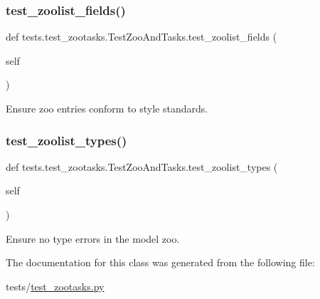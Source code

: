 \subsubsection{\texorpdfstring{test\+\_\+zoolist\+\_\+fields()}{test\_zoolist\_fields()}}
{\footnotesize\ttfamily def tests.\+test\+\_\+zootasks.\+Test\+Zoo\+And\+Tasks.\+test\+\_\+zoolist\+\_\+fields (\begin{DoxyParamCaption}\item[{}]{self }\end{DoxyParamCaption})}

\begin{DoxyVerb}Ensure zoo entries conform to style standards.
\end{DoxyVerb}
 \mbox{\label{classtests_1_1test__zootasks_1_1TestZooAndTasks_a8d7616fa41ed03322c86a565eedb4e8c}} 
\subsubsection{\texorpdfstring{test\+\_\+zoolist\+\_\+types()}{test\_zoolist\_types()}}
{\footnotesize\ttfamily def tests.\+test\+\_\+zootasks.\+Test\+Zoo\+And\+Tasks.\+test\+\_\+zoolist\+\_\+types (\begin{DoxyParamCaption}\item[{}]{self }\end{DoxyParamCaption})}

\begin{DoxyVerb}Ensure no type errors in the model zoo.
\end{DoxyVerb}
 

The documentation for this class was generated from the following file\+:\begin{DoxyCompactItemize}
\item 
tests/\hyperlink{test__zootasks_8py}{test\+\_\+zootasks.\+py}\end{DoxyCompactItemize}
